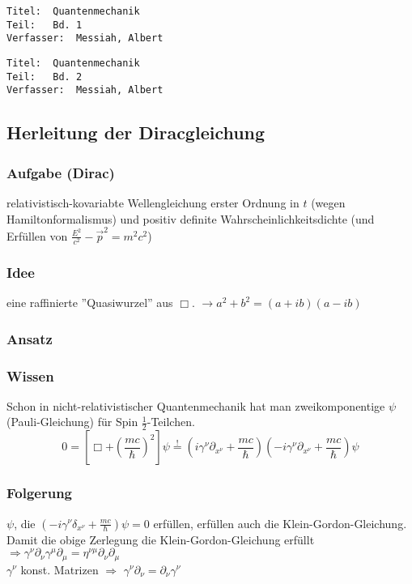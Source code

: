 \documentclass[twoside,a4paper]{scrartcl}
\renewcommand{\1}{\mathds{1}}
\newcommand{\Ra}{\Rightarrow}
\newcommand{\ra}{\rightarrow}
\begin{document}
\begin{tiny}
\begin{verbatim}
Titel: 	Quantenmechanik
Teil: 	Bd. 1
Verfasser: 	Messiah, Albert
\end{verbatim}
\end{tiny}

\begin{tiny}
\begin{verbatim}
Titel: 	Quantenmechanik
Teil: 	Bd. 2
Verfasser: 	Messiah, Albert
\end{verbatim}
\end{tiny}


\subsection{Herleitung der Diracgleichung}
\subsubsection*{Aufgabe (Dirac)}
relativistisch-kovariabte Wellengleichung erster Ordnung in $t$ (wegen Hamiltonformalismus) und positiv definite Wahrscheinlichkeitsdichte (und Erfüllen von $\frac{E^2}{c^2}-\vec p^2=m^2c^2$)
\subsubsection*{Idee}
eine raffinierte ''Quasiwurzel'' aus $\Box$. $\ra a^2+b^2=(a+ib)(a-ib)$
\subsubsection*{Ansatz}
\subsubsection*{Wissen}
Schon in nicht-relativistischer Quantenmechanik hat man zweikomponentige $\psi$ (Pauli-Gleichung) für Spin $\frac{1}{2}$-Teilchen.
$$0=[\Box+(\frac{mc}{\hbar})^2]\psi\stackrel{!}{=} (i\gamma^\nu\partial_{x^\nu}+\frac{mc}{\hbar})(-i\gamma^\nu\partial_{x^\nu}+\frac{mc}{\hbar})\psi$$
\subsubsection*{Folgerung}
$\psi$, die $(-i\gamma^\nu\delta_{x^\nu}+\frac{mc}{\hbar})\psi=0$ erfüllen, erfüllen auch die Klein-Gordon-Gleichung.\\
Damit die obige Zerlegung die Klein-Gordon-Gleichung erfüllt $\Ra \gamma^\nu\partial_\nu \gamma^\mu \partial_\mu=\eta^{\nu \mu} \partial_\nu \partial_\mu$\\
$\gamma^\nu$ konst. Matrizen $\Ra$ $\gamma^\nu \partial_\nu=\partial_\nu \gamma^\nu$ 
\end{document}
